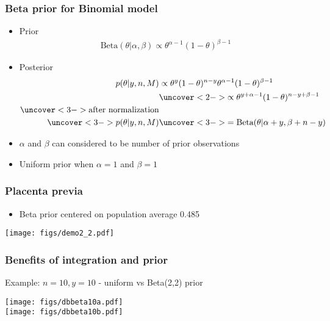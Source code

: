 \documentclass[10pt]{beamer}
\begin{document}
\begin{frame}

  \frametitle{Beta prior for Binomial model}

  \begin{itemize}
  \item Prior \baselineskip
    \begin{align*}
      \text{Beta}(\theta|\alpha,\beta) \propto \theta^{\alpha-1}
      (1-\theta)^{\beta-1}
    \end{align*}
  \item Posterior
    \baselineskip
    \begin{align*}
      p(\theta|y,n,M) & \propto \theta^y(1-\theta)^{n-y}
      \theta^{\alpha-1} (1-\theta)^{\beta-1}\\
      &\uncover<2->{ \propto
        \theta^{y+\alpha-1} (1-\theta)^{n-y+\beta-1}}\\
      \uncover<3->{\text{after normalization}} &\\
      \uncover<3->{p(\theta|y,n,M)}
      &\uncover<3->{ = \text{Beta}(\theta|\alpha+y,\beta+n-y)}
    \end{align*}
    \vskip -2mm
  \item<4-> $\alpha$ and $\beta$ can considered to be number of prior observations
  \item<4-> Uniform prior when $\alpha=1$ and $\beta=1$
  \end{itemize}
\end{frame}


\begin{frame}
  \frametitle{Placenta previa}

  \begin{itemize}
  \item Beta prior centered on population average 0.485
  \end{itemize}
  \texttt{[image: figs/demo2\_2.pdf]}
\end{frame}

\begin{frame}
  \frametitle{Benefits of integration and prior}

  \vspace{-0.5\baselineskip}
  Example: $n=10, y=10$ - uniform vs Beta(2,2) prior
  \begin{center}
  \texttt{[image: figs/dbbeta10a.pdf]}\\
  \texttt{[image: figs/dbbeta10b.pdf]}
  \end{center}

\end{frame}
\end{document}
